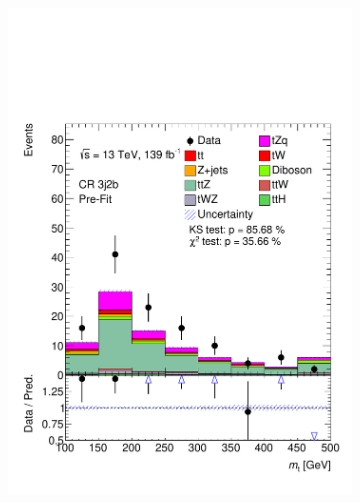 \begin{figure}[!h]
\begin{subfigure}[b]{0.33\linewidth}
    \includegraphics[width=\linewidth]{ubonn-thesis/Chapters/Chapters_06/Figure/Input_distribution/CR_3j2b_Top_mass.pdf} 
  \end{subfigure} 
  \begin{subfigure}[b]{0.33\linewidth}
    \centering

\end{subfigure}
\end{figure}
